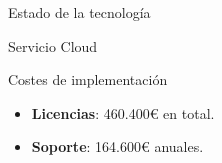 \begin{chapter}{Estado de la tecnología}
\begin{section}{Servicio Cloud}
\begin{subsection}{Costes de implementación}
        \begin{itemize}
            \item \textbf{Licencias}: 460.400€ en total.
            \item \textbf{Soporte}: 164.600€ anuales.
        \end{itemize}
    \end{subsection}
    
\end{section}
\end{chapter}